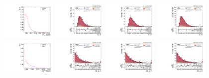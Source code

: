 \begin{figure}[!ht]
  \centering
  \includegraphics[width=0.23\textwidth]{analysis_plots/tmva_plots/zv_BDTG14_dibos_m.pdf}
  \includegraphics[width=0.23\textwidth]{analysis_plots/2016_zv/cr_vjets_l/vv_m.pdf}
  \includegraphics[width=0.23\textwidth]{analysis_plots/2017_zv/cr_vjets_l/vv_m.pdf}
  \includegraphics[width=0.23\textwidth]{analysis_plots/2018_zv/cr_vjets_l/vv_m.pdf}\\
  \includegraphics[width=0.23\textwidth]{analysis_plots/tmva_plots/zv_BDTG14_vbf_m.pdf}
  \includegraphics[width=0.23\textwidth]{analysis_plots/2016_zv/cr_vjets_l/vbf_jj_m.pdf}
  \includegraphics[width=0.23\textwidth]{analysis_plots/2017_zv/cr_vjets_l/vbf_jj_m.pdf}
  \includegraphics[width=0.23\textwidth]{analysis_plots/2018_zv/cr_vjets_l/vbf_jj_m.pdf}\\

\end{figure}
